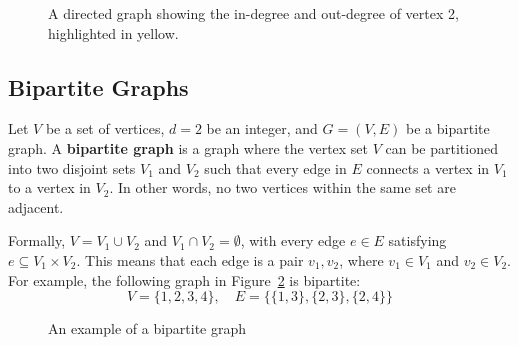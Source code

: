 \begin{figure}[h]
\begin{center}
\caption{A directed graph showing the in-degree and out-degree of vertex 2, highlighted in yellow.}
\label{fig:directed_degree}
\end{center}
\end{figure}

\subsection{Bipartite Graphs}
Let \( V \) be a set of vertices, \( d = 2 \) be an integer, and \( G = (V, E) \) be a bipartite graph. A \textbf{bipartite graph} is a graph where the vertex set \( V \) can be partitioned into two disjoint sets \( V_1 \) and \( V_2 \) such that every edge in \( E \) connects a vertex in \( V_1 \) to a vertex in \( V_2 \). In other words, no two vertices within the same set are adjacent.  \cite{yadav2023advanced}

Formally, \( V = V_1 \cup V_2 \) and \( V_1 \cap V_2 = \emptyset \), with every edge \( e \in E \) satisfying \(e \subseteq V_1 \times V_2\). This means that each edge is a pair \(v_1, v_2\), where \( v_1 \in V_1 \) and \( v_2 \in V_2 \). For example, the following graph in Figure~\ref{fig:bipartite} is bipartite:
\[
V = \{1, 2, 3, 4\}, \quad E = \{\{1, 3\}, \{2,3\}, \{2, 4\}\}
\]

\begin{figure}[h]
\begin{center}
\caption{An example of a bipartite graph}
\label{fig:bipartite}
\end{center}
\end{figure}

